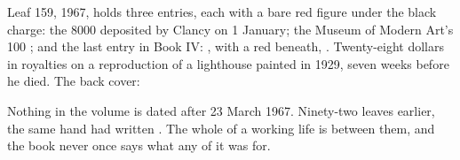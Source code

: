 Leaf 159, 1967, holds three entries, each with a bare red figure under the black charge: the 8000 deposited by Clancy on 1 January; the Museum of Modern Art's 100 ; and the last entry in Book IV: , with a red  beneath, . Twenty-eight dollars in royalties on a reproduction of a lighthouse painted in 1929, seven weeks before he died.  The back cover: 

Nothing in the volume is dated after 23 March 1967. Ninety-two leaves earlier, the same hand had written . The whole of a working life is between them, and the book never once says what any of it was for.
